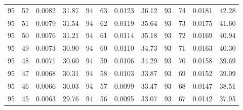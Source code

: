 \begin{tabular}{llll|llll|llll}
95 & 52 & 0.0082 & 31.87 & 94 & 63 & 0.0123 & 36.12 & 93 & 74 & 0.0181 & 42.28\\
95 & 51 & 0.0079 & 31.54 & 94 & 62 & 0.0119 & 35.64 & 93 & 73 & 0.0175 & 41.60\\
95 & 50 & 0.0076 & 31.21 & 94 & 61 & 0.0114 & 35.18 & 93 & 72 & 0.0169 & 40.94\\
95 & 49 & 0.0073 & 30.90 & 94 & 60 & 0.0110 & 34.73 & 93 & 71 & 0.0163 & 40.30\\
95 & 48 & 0.0071 & 30.60 & 94 & 59 & 0.0106 & 34.29 & 93 & 70 & 0.0158 & 39.69\\
95 & 47 & 0.0068 & 30.31 & 94 & 58 & 0.0103 & 33.87 & 93 & 69 & 0.0152 & 39.09\\
95 & 46 & 0.0066 & 30.03 & 94 & 57 & 0.0099 & 33.47 & 93 & 68 & 0.0147 & 38.51\\
95 & 45 & 0.0063 & 29.76 & 94 & 56 & 0.0095 & 33.07 & 93 & 67 & 0.0142 & 37.95\\
\bottomrule
\end{tabular}
\newpage
